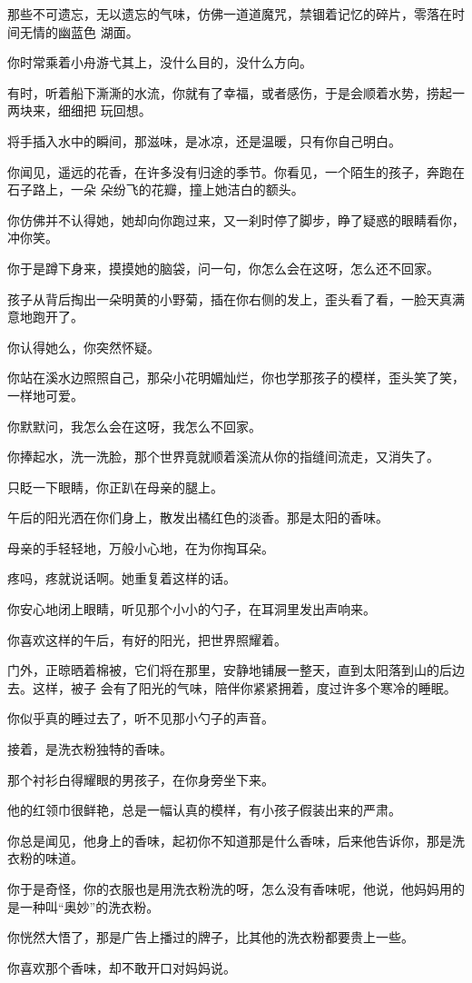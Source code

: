 \documentclass[12pt,a4paper]{article}
\def\blankrev{\vspace{1ex}}									%
\begin{document}
		那些不可遗忘，无以遗忘的气味，仿佛一道道魔咒，禁锢着记忆的碎片，零落在时间无情的幽蓝色
	湖面。

		你时常乘着小舟游弋其上，没什么目的，没什么方向。

		有时，听着船下澌澌的水流，你就有了幸福，或者感伤，于是会顺着水势，捞起一两块来，细细把
	玩回想。

		将手插入水中的瞬间，那滋味，是冰凉，还是温暖，只有你自己明白。

		\blankrev
		你闻见，遥远的花香，在许多没有归途的季节。你看见，一个陌生的孩子，奔跑在石子路上，一朵
	朵纷飞的花瓣，撞上她洁白的额头。

		你仿佛并不认得她，她却向你跑过来，又一刹时停了脚步，睁了疑惑的眼睛看你，冲你笑。\par
		你于是蹲下身来，摸摸她的脑袋，问一句，你怎么会在这呀，怎么还不回家。\par
		孩子从背后掏出一朵明黄的小野菊，插在你右侧的发上，歪头看了看，一脸天真满意地跑开了。\par
		你认得她么，你突然怀疑。\par
		你站在溪水边照照自己，那朵小花明媚灿烂，你也学那孩子的模样，歪头笑了笑，一样地可爱。\par
		你默默问，我怎么会在这呀，我怎么不回家。\par
		你捧起水，洗一洗脸，那个世界竟就顺着溪流从你的指缝间流走，又消失了。

		\blankrev
		只眨一下眼睛，你正趴在母亲的腿上。\par
		午后的阳光洒在你们身上，散发出橘红色的淡香。那是太阳的香味。\par
		母亲的手轻轻地，万般小心地，在为你掏耳朵。\par
		疼吗，疼就说话啊。她重复着这样的话。\par
		你安心地闭上眼睛，听见那个小小的勺子，在耳洞里发出声响来。\par
		你喜欢这样的午后，有好的阳光，把世界照耀着。

		门外，正晾晒着棉被，它们将在那里，安静地铺展一整天，直到太阳落到山的后边去。这样，被子
	会有了阳光的气味，陪伴你紧紧拥着，度过许多个寒冷的睡眠。

		你似乎真的睡过去了，听不见那小勺子的声音。\par
		接着，是洗衣粉独特的香味。

		\blankrev
		那个衬衫白得耀眼的男孩子，在你身旁坐下来。\par
		他的红领巾很鲜艳，总是一幅认真的模样，有小孩子假装出来的严肃。\par
		你总是闻见，他身上的香味，起初你不知道那是什么香味，后来他告诉你，那是洗衣粉的味道。\par
		你于是奇怪，你的衣服也是用洗衣粉洗的呀，怎么没有香味呢，他说，他妈妈用的是一种叫“奥妙”的洗衣粉。\par
		你恍然大悟了，那是广告上播过的牌子，比其他的洗衣粉都要贵上一些。\par
		你喜欢那个香味，却不敢开口对妈妈说。
\end{document}
